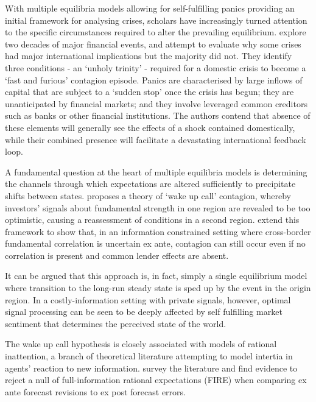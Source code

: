 \documentclass[../base.tex]{subfiles}
\begin{document}
With multiple equilibria models allowing for self-fulfilling panics providing an initial framework for analysing crises, scholars have increasingly turned attention to the specific circumstances required to alter the prevailing equilibrium. \cite{kaminsky2003unholy} explore two decades of major financial events, and attempt to evaluate why some crises had major international implications but the majority did not. They identify three conditions - an `unholy trinity' - required for a domestic crisis to become a `fast and furious' contagion episode. Panics are characterised by large inflows of capital that are subject to a `sudden stop' once the crisis has begun; they are unanticipated by financial markets; and they involve leveraged common creditors such as banks or other financial institutions. The authors contend that absence of these elements will generally see the effects of a shock contained domestically, while their combined presence will facilitate a devastating international feedback loop. 



A fundamental question at the heart of multiple equilibria models is determining the channels through which expectations are altered sufficiently to precipitate shifts between states. \cite{goldstein1998asian} proposes a theory of `wake up call' contagion, whereby investors' signals about fundamental strength in one region are revealed to be too optimistic, causing a reassessment of conditions in a second region. \cite{ahnert2015wake} extend this framework to show that, in an information constrained setting where cross-border fundamental correlation is uncertain ex ante, contagion can still occur even if no correlation is present and common lender effects are absent. 

It can be argued that this approach is, in fact, simply a single equilibrium model where transition to the long-run steady state is sped up by the event in the origin region. In a costly-information setting with private signals, however, optimal signal processing can be seen to be deeply affected by self fulfilling market sentiment that determines the perceived state of the world.

The wake up call hypothesis is closely associated with models of rational inattention, a branch of theoretical literature attempting to model intertia in agents' reaction to new information.  \cite{coibion2010information} survey the literature and find evidence to reject a null of full-information rational expectations (FIRE) when comparing ex ante forecast revisions to ex post forecast errors. 
\end{document}
